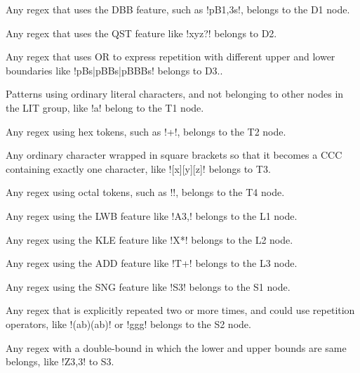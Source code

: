 \begin{description}  \itemsep -1pt
\item[D1:] Any regex that uses the DBB feature, such as \cverb!pB{1,3}s!, belongs to the D1 node.
\item[D2:] Any regex that uses the QST feature like \cverb!xyz?! belongs to D2.
\item[D3:] Any regex that uses OR to express repetition with different upper and lower boundaries like \cverb!pBs|pBBs|pBBBs! belongs to D3..
\end{description}

\begin{description}  \itemsep -1pt
\item[T1:] Patterns using ordinary literal characters, and not belonging to other nodes in the LIT group, like \cverb!a! belong to the T1 node.
\item[T2:] Any regex using hex tokens, such as \cverb!+!, belongs to the T2 node.
\item[T3:]  Any ordinary character wrapped in square brackets so that it becomes a CCC containing exactly one character, like \cverb![x][y][z]! belongs to T3.
\item[T4:] Any regex using octal tokens, such as \cverb!!, belongs to the T4 node.
\end{description}

\begin{description}  \itemsep -1pt
\item[L1:] Any regex using the LWB feature like \cverb!A{3,}! belongs to the L1 node.
\item[L2:] Any regex using the KLE feature like \cverb!X*! belongs to the L2 node.
\item[L3:] Any regex using the ADD feature like \cverb!T+! belongs to the L3 node.
\end{description}

\begin{description}  \itemsep -1pt
\item[S1:] Any regex using the SNG feature like \cverb!S{3}! belongs to the S1 node.
\item[S2:] Any regex that is explicitly repeated two or more times, and could use repetition operators, like \cverb!(ab)(ab)! or \cverb!ggg! belongs to the S2 node.
\item[S3:] Any regex with a double-bound in which the lower and upper bounds are same belongs, like \cverb!Z{3,3}! to S3.
\end{description}

